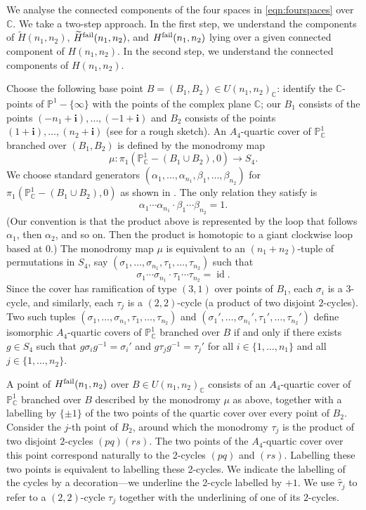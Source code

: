 \documentclass{amsart}
\numberwithin{equation}{section} \numberwithin{figure}{section}
\DeclareMathOperator{\id}{id}
\newcommand\PP{\mathbb{P}}
\newcommand\CC{\mathbb{C}}
\theoremstyle{one}
\theoremstyle{definition}
\begin{document}
We analyse the connected components of the four spaces in \eqref{eqn:fourspaces} over \(\CC\).
We take a two-step approach.
In the first step, we understand the components of \(\widetilde H(n_1,n_2)\), \(\widetilde H^{\rm fail}(n_1,n_2)\), and \(H^{\rm fail}(n_1,n_2)\) lying over a given connected component of \(H(n_1,n_2)\).
In the second step, we understand the connected components of \(H(n_1,n_2)\).

Choose the following base point \(B=(B_1,B_2) \in U(n_1,n_2)_{\CC}\):
identify the \(\CC\)-points of \(\PP^1-\{\infty\}\) with the points of the complex plane \(\CC\);
our \(B_1\) consists of the points \((-n_1+\mathbf{i}), \dots, (-1+\mathbf{i})\) and \(B_2\) consists of the points \((1+\mathbf{i}), \dots, (n_{2}+\mathbf{i})\) (see  for a rough sketch).
An \(A_4\)-quartic cover of \(\PP^1_{\CC}\) branched over \((B_1,B_2)\) is defined by the monodromy map
\[ \mu \colon \pi_1(\PP^1_{\CC} - (B_1 \cup B_2), 0) \to S_4.\]
We choose standard generators \((\alpha_1, \dots, \alpha_{n_1}, \beta_{1}, \dots, \beta_{n_2})\) for \(\pi_1(\PP^1_{\CC} - (B_1 \cup B_2), 0)\) as shown in . 
The only relation they satisfy is 
\[ \alpha_1 \cdots \alpha_{n_1} \cdot \beta_1 \cdots \beta_{n_2} = 1.\]
(Our convention is that the product above is represented by the loop that follows \(\alpha_1\), then \(\alpha_2\), and so on.  Then the product is homotopic to a giant clockwise loop based at \(0\).)
The monodromy map \(\mu\) is equivalent to an \((n_1+n_2)\)-tuple of permutations in \(S_4\), say \((\sigma_1, \dots, \sigma_{n_1},\tau_1, \dots, \tau_{n_2})\) such that
\[ \sigma_1\cdots \sigma_{n_1} \cdot \tau_1 \cdots \tau_{n_2} = \id.\]
Since the cover has ramification of type \((3,1)\) over points of \(B_1\), each \(\sigma_i\) is a \(3\)-cycle, and similarly, each \(\tau_j\) is a \((2,2)\)-cycle (a product of two disjoint \(2\)-cycles).
Two such tuples \((\sigma_1, \dots, \sigma_{n_1},\tau_1, \dots, \tau_{n_2})\) and  \((\sigma_1', \dots, \sigma_{n_1}',\tau_1', \dots, \tau_{n_2}')\)
define isomorphic \(A_4\)-quartic covers of $\PP^1_\CC$ branched over $B$ if and only if there exists $g\in S_4$ such that $g\sigma_ig^{-1}=\sigma_i'$ and $g\tau_jg^{-1}=\tau_j'$ for all $i\in\{1,\dots, n_1\}$ and all $j\in\{1,\dots, n_2\}$.


A point of \(H^{\rm fail}(n_1,n_2)\) over \(B \in U(n_1,n_2)_{\CC}\) consists of an \(A_4\)-quartic cover of $\PP^1_\CC$ branched over $B$ described by the monodromy \(\mu\) as above, together with a labelling by \(\{\pm 1\}\) of the two points of the quartic cover over every point of \(B_2\).
Consider the \(j\)-th point of \(B_2\), around which the monodromy \(\tau_j\) is the product of two disjoint \(2\)-cycles \((pq)(rs)\).
The two points of the \(A_4\)-quartic cover over this point correspond naturally to the 2-cycles \((pq)\) and \((rs)\).
Labelling these two points is equivalent to labelling these 2-cycles.
We indicate the labelling of the cycles by a decoration---we underline the 2-cycle labelled by \(+1\).
We use \(\hat{\tau}_j\) to refer to a \((2,2)\)-cycle \(\tau_j\) together with the underlining of one of its \(2\)-cycles.
\end{document}
